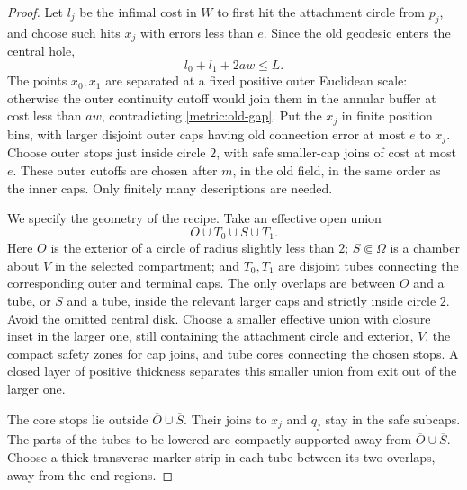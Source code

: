 \begin{proof}
Let $l_j$ be the infimal cost in $W$ to first hit the attachment circle from
$p_j$, and choose such hits $x_j$ with errors less than $e$. Since the old
geodesic enters the central hole,
\begin{equation}\label{metric:old-gap}
 l_0+l_1+2aw\le L.
\end{equation}
The points $x_0,x_1$ are separated at a fixed positive outer Euclidean
scale: otherwise the outer continuity cutoff would join them in the
annular buffer at cost less than $aw$, contradicting
\eqref{metric:old-gap}. Put the $x_j$ in finite position bins, with larger
disjoint outer caps having old connection error at most $e$ to $x_j$.
Choose outer stops just inside circle $2$, with safe smaller-cap joins of
cost at most $e$. These outer cutoffs are chosen after $m$, in the old
field, in the same order as the inner caps. Only finitely many descriptions
are needed.

We specify the geometry of the recipe. Take an effective open union
\[
 O\cup T_0\cup S\cup T_1.
\]
Here $O$ is the exterior of a circle of radius slightly less than $2$;
$S\Subset\Omega$ is a chamber about $V$ in the selected compartment; and
$T_0,T_1$ are disjoint tubes connecting the corresponding outer and
terminal caps. The only overlaps are between $O$ and a tube, or $S$ and
a tube, inside the relevant larger caps and strictly inside circle $2$.
Avoid the omitted central disk. Choose a smaller effective union with
closure inset in the larger one, still containing the attachment circle
and exterior, $V$, the compact safety zones for cap joins, and tube cores
connecting the chosen stops. A closed layer of positive thickness
separates this smaller union from exit out of the larger one.

The core stops lie outside $\overline O\cup\overline S$. Their joins to
$x_j$ and $q_j$ stay in the safe subcaps. The parts of the tubes to be
lowered are compactly supported away from $\overline O\cup\overline S$.
Choose a thick transverse marker strip in each tube between its two
overlaps, away from the end regions.


\end{proof}
